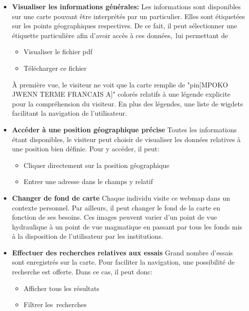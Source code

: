 \begin{itemize}
    \item \textbf{Visualiser les informations générales:}
    Les informations sont disponibles sur une carte pouvant être interprétés
    par un particulier. Elles sont étiquetées sur les points géographiques respectives.
    De ce fait, il peut sélectionner une étiquette particulière afin d'avoir 
    accès à ces données, lui permettant de 
    \begin{itemize}
        \item Visualiser le fichier pdf
        \item Télécharger ce fichier
    \end{itemize}
    \par 
    À première vue, le visiteur ne voit que la carte remplie de 
    "pin[MPOKO JWENN TERME FRANCAIS A]" colorés relatifs à une légende 
    explicite pour la compréhension du visiteur. En plus des légendes, une liste 
    de wigdets facilitant la navigation de l'utilisateur.
    \item \textbf{Accéder à une position géographique précise}
    Toutes les informations étant disponibles, le visiteur peut choisir 
    de visualiser les données relatives à une position bien définie. Pour y accéder, il 
    peut:
    \begin{itemize}
        \item Cliquer directement sur la position géographique
        \item Entrer une adresse dans le champs y relatif
    \end{itemize}
    \item \textbf{Changer de fond de carte}
    Chaque individu visite ce webmap dans un contexte personnel. Par 
    ailleurs, il peut changer le fond de la carte en fonction de 
    ses besoins. Ces images peuvent varier d'un point de vue hydraulique
    à un point de vue magmatique en passant par tous les fonds mis 
    à la disposition de l'utilisateur par les institutions.
    \item \textbf{Effectuer des recherches relatives aux essais}
    Grand nombre d'essais sont enregistrés sur la carte. Pour faciliter 
    la navigation, une possibilité de recherche est offerte. Dans ce cas,
    il peut donc:
    \begin{itemize}
        \item Afficher tous les résultats
        \item Filtrer les recherches 
    \end{itemize}
\end{itemize}

